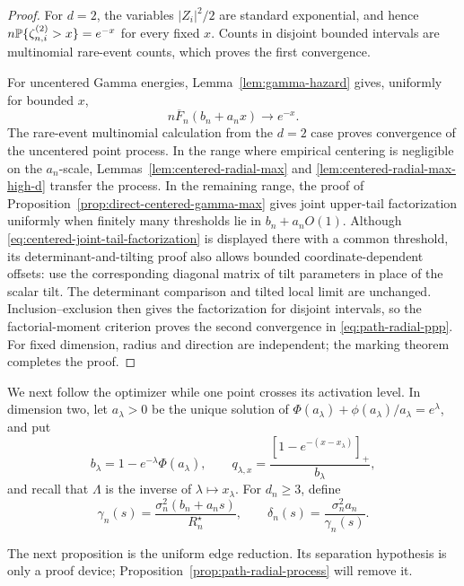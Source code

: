\begin{proof}
For \(d=2\), the variables \(|Z_i|^2/2\) are standard exponential, and hence
\(n\mathbb P\{\zeta_{n,i}^{(2)}>x\}=e^{-x}\) for every fixed \(x\). Counts in
disjoint bounded intervals are multinomial rare-event counts, which proves the
first convergence.

For uncentered Gamma energies, Lemma~\ref{lem:gamma-hazard} gives, uniformly
for bounded \(x\),
\[
 n\overline F_n(b_n+a_nx)\longrightarrow e^{-x}.
\]
The rare-event multinomial calculation from the \(d=2\) case proves
convergence of the uncentered point process. In the range where empirical
centering is negligible on the
\(a_n\)-scale, Lemmas~\ref{lem:centered-radial-max} and
\ref{lem:centered-radial-max-high-d} transfer the process. In the remaining
range, the proof of Proposition~\ref{prop:direct-centered-gamma-max} gives
joint upper-tail factorization uniformly when finitely many thresholds lie in
\(b_n+a_nO(1)\). Although \eqref{eq:centered-joint-tail-factorization} is
displayed there with a common threshold, its determinant-and-tilting proof
also allows bounded coordinate-dependent offsets: use the corresponding
diagonal matrix of tilt parameters in place of the scalar tilt. The
determinant comparison and tilted local limit are unchanged.
Inclusion--exclusion then gives the factorization
for disjoint intervals, so the factorial-moment criterion proves the second
convergence in \eqref{eq:path-radial-ppp}. For fixed dimension, radius and
direction are independent; the marking theorem completes the proof.
\end{proof}

We next follow the optimizer while one point crosses its activation level. In
dimension two, let \(a_\lambda>0\) be the unique solution of
\(\Phi(a_\lambda)+\phi(a_\lambda)/a_\lambda=e^\lambda\), and put
\begin{equation}
\label{eq:path-d2-mass-profile}
 b_\lambda=1-e^{-\lambda}\Phi(a_\lambda),
 \qquad
 q_{\lambda,x}
 =\frac{[1-e^{-(x-x_\lambda)}]_+}{b_\lambda},
\end{equation}
and recall that \(\Lambda\) is the inverse of
\(\lambda\mapsto x_\lambda\). For \(d_n\ge3\), define
\begin{equation}
\label{eq:path-highd-scales}
 \gamma_n(s)=\frac{\sigma_n^2(b_n+a_ns)}{R_n^\star},
 \qquad
 \delta_n(s)=\frac{\sigma_n^2a_n}{\gamma_n(s)}.
\end{equation}

The next proposition is the uniform edge reduction. Its separation
hypothesis is only a proof device; Proposition~\ref{prop:path-radial-process}
will remove it.

